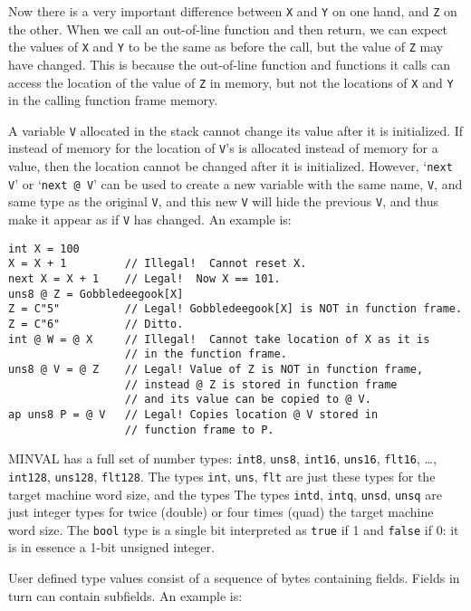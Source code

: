 \documentclass[12pt]{article}
\newenvironment{indpar}[1][0.3in]%
	{\begin{list}{}%
		     {\setlength{\itemsep}{0in}%
		      \setlength{\topsep}{0in}%
		      \setlength{\parsep}{1ex}%
		      \setlength{\labelwidth}{#1}%
		      \setlength{\leftmargin}{#1}%
		      \addtolength{\leftmargin}{\labelsep}}%
	 \item}%
	{\end{list}}
\begin{document}
Now there is a very important difference between {\tt X} and {\tt Y} on one
hand, and {\tt Z} on the other.  When we call an
out-of-line function and then return, we can expect the values of
{\tt X} and {\tt Y} to be the same as before the call, but the value of
{\tt Z} may have changed.  This is because the out-of-line
function and functions it calls can access the location of the value of
{\tt Z} in memory, but not the locations of {\tt X} and {\tt Y}
in the calling function frame memory.

A variable {\tt V} allocated in the stack cannot change its value after
it is initialized.  If instead of memory for the location of
{\tt V}'s is allocated instead of memory for a value, then the location
cannot be changed after it is initialized.  However, `{\tt next V}'
or `{\tt next @ V}' can be used to create a new variable with the same
name, {\tt V}, and same type as the original {\tt V}, and this new
{\tt V} will hide the previous {\tt V}, and thus make it appear as
if {\tt V} has changed.  An example is:
\begin{indpar}\begin{verbatim}
int X = 100
X = X + 1         // Illegal!  Cannot reset X.
next X = X + 1    // Legal!  Now X == 101.
uns8 @ Z = Gobbledeegook[X]
Z = C"5"          // Legal! Gobbledeegook[X] is NOT in function frame.
Z = C"6"          // Ditto.
int @ W = @ X     // Illegal!  Cannot take location of X as it is
                  // in the function frame.
uns8 @ V = @ Z    // Legal! Value of Z is NOT in function frame,
                  // instead @ Z is stored in function frame
                  // and its value can be copied to @ V.
ap uns8 P = @ V   // Legal! Copies location @ V stored in
                  // function frame to P.
\end{verbatim}\end{indpar}

MINVAL has a full set of number types:
{\tt int8}, {\tt uns8},
{\tt int16}, {\tt uns16}, {\tt flt16}, \ldots,
{\tt int128}, {\tt uns128}, {\tt flt128}.
The types {\tt int}, {\tt uns}, {\tt flt} are just these
types for the target machine word size, and the types
The types {\tt intd}, {\tt intq}, {\tt unsd}, {\tt unsq} are just integer
types for twice (double) or four times (quad) the target machine word size.
The {\tt bool} type is a single bit interpreted as {\tt true} if
1 and {\tt false} if 0: it is in essence a 1-bit unsigned integer.

User defined type values consist of a sequence of bytes containing fields.
Fields in turn can contain subfields.
An example is:
\end{document}
